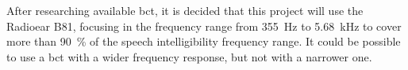 After researching available \gls{bct}, it is decided that this project will use the Radioear B81, focusing in the frequency range 
from \SI{355}{\hertz} to \SI{5.68}{\kilo\hertz} to cover more than \SI{90}{\percent} of the speech intelligibility frequency range. It could be possible to use a \gls{bct} with a wider frequency response, but not with a narrower one.
